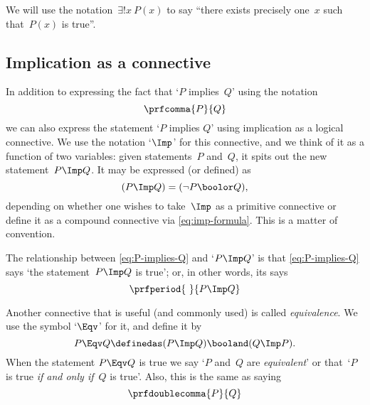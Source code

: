 We will use the notation~$\exists!
    x \ P(x)$ to say ``there exists precisely one~$x$ such that~$P(x)$ is true''.

\subsection{Implication as a connective}

In addition to expressing the fact that `$P$ implies~$Q$' using the notation
\begin{equation}
    \label{eq:P-implies-Q}
    \prfcomma
    {P}{Q}
\end{equation}
we can also express the statement `$P$ implies $Q$' using implication as a logical connective.
We use the notation `$\Imp$' for this connective, and we think of it as a function of two variables:
given statements~$P$ and~$Q$, it spits out the new statement~$P \Imp Q$.
It may be expressed (or defined) as
\begin{equation}
    \label{eq:imp-formula}
    (P \Imp Q) = (\lnot P \boolor Q),
\end{equation}
depending on whether one wishes to take~$\Imp$ as a primitive connective or define it as a compound connective via \cref{eq:imp-formula}.
This is a matter of convention.

The relationship between \cref{eq:P-implies-Q} and `$P \Imp Q$' is that  \cref{eq:P-implies-Q} says `the statement~$P \Imp Q$ is true'; or, in other words, its says
\begin{equation*}
    \prfperiod
    {\ }{P \Imp Q}
\end{equation*}

Another connective that is useful (and commonly used) is called \emph{equivalence}.
We use the symbol `$\Eqv$' for it, and define it by
\begin{equation*}
    P \Eqv Q \definedas (P \Imp Q) \booland (Q \Imp P).
\end{equation*}
When the statement $P \Eqv Q$ is true we say `$P$ and~$Q$ are \emph{equivalent}' or that~`$P$ is true \emph{if and only if}~$Q$ is true'.
Also, this is the same as saying
\begin{equation*}
    \prfdoublecomma{
        P
    }{
        Q
    }
\end{equation*}
